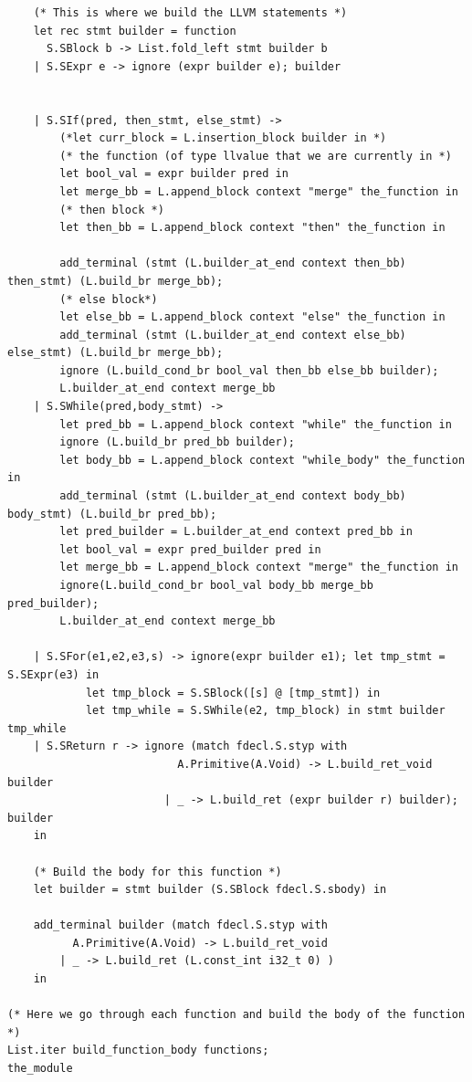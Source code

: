 \documentclass{article}
\begin{document}
\begin{lstlisting}
	(* This is where we build the LLVM statements *)
	let rec stmt builder = function 
	  S.SBlock b -> List.fold_left stmt builder b
	| S.SExpr e -> ignore (expr builder e); builder
	
	
	| S.SIf(pred, then_stmt, else_stmt) -> 
		(*let curr_block = L.insertion_block builder in *)
		(* the function (of type llvalue that we are currently in *)
		let bool_val = expr builder pred in
		let merge_bb = L.append_block context "merge" the_function in
		(* then block *)
		let then_bb = L.append_block context "then" the_function in

		add_terminal (stmt (L.builder_at_end context then_bb) then_stmt) (L.build_br merge_bb);
		(* else block*)
		let else_bb = L.append_block context "else" the_function in 
		add_terminal (stmt (L.builder_at_end context else_bb) else_stmt) (L.build_br merge_bb);	
		ignore (L.build_cond_br bool_val then_bb else_bb builder);
		L.builder_at_end context merge_bb
	| S.SWhile(pred,body_stmt) ->  
		let pred_bb = L.append_block context "while" the_function in
		ignore (L.build_br pred_bb builder);
		let body_bb = L.append_block context "while_body" the_function in
		add_terminal (stmt (L.builder_at_end context body_bb) body_stmt) (L.build_br pred_bb);
		let pred_builder = L.builder_at_end context pred_bb in
		let bool_val = expr pred_builder pred in
		let merge_bb = L.append_block context "merge" the_function in
		ignore(L.build_cond_br bool_val body_bb merge_bb pred_builder);	
		L.builder_at_end context merge_bb

	| S.SFor(e1,e2,e3,s) -> ignore(expr builder e1); let tmp_stmt = S.SExpr(e3) in 
			let tmp_block = S.SBlock([s] @ [tmp_stmt]) in  
			let tmp_while = S.SWhile(e2, tmp_block) in stmt builder tmp_while 
	| S.SReturn r -> ignore (match fdecl.S.styp with
						  A.Primitive(A.Void) -> L.build_ret_void builder
						| _ -> L.build_ret (expr builder r) builder); builder 
	in
	
	(* Build the body for this function *)
	let builder = stmt builder (S.SBlock fdecl.S.sbody) in
		
	add_terminal builder (match fdecl.S.styp with
          A.Primitive(A.Void) -> L.build_ret_void
        | _ -> L.build_ret (L.const_int i32_t 0) )
	in
	
(* Here we go through each function and build the body of the function *)
List.iter build_function_body functions;
the_module


\end{lstlisting}
\end{document}
